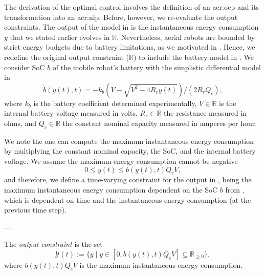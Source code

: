 The derivation of the optimal control involves the definition of an \Gls{acr:ocp} and its transformation into an \Gls{acr:nlp}. Before, however, we re-evaluate the output constraints. The output of the model in  is the instantaneous energy consumption $y$ that we stated earlier evolves in $\mathbb{R}$. Nevertheless, aerial robots are bounded by strict energy budgets due to battery limitations, as we motivated in . Hence, we redefine the original output constraint ($\mathbb{R}$) to include the battery model in . We consider SoC $b$ of the mobile robot's battery with the simplistic differential model in 
\begin{equation}\label{eq:bat}
  \dot{b}(y(t),t)=-k_b\left(V-
  \sqrt{
    V^2-
    4R_ry(t)}
  \right)/(2R_rQ_c),
\end{equation}
where $k_b$ is the battery coefficient determined experimentally,  $V\in\mathbb{R}$ is the internal battery voltage measured in volts, $R_r\in\mathbb{R}$ the resistance measured in ohms, and $Q_c\in\mathbb{R}$ the constant nominal capacity measured in amperes per hour. 

We note the one can compute the maximum instantaneous energy consumption by multiplying the constant nominal capacity, the SoC, and the internal battery voltage. We assume the maximum energy consumption cannot be negative
\begin{equation}
  0\leq y(t)\leq b(y(t),t)Q_cV,
\end{equation}
and therefore, we define a time-varying constraint for the output in , being the maximum instantaneous energy consumption dependent on the SoC $b$ from , which is dependent on time and the instantaneous energy consumption (at the previous time step).

---

\begin{highlight}
\begin{defn}\label{def:const}
The \emph{output constraint} is the set
\begin{equation*}
  \mathcal{Y}(t):=\{y\mid y\in[0,b(y(t),t)Q_cV]\subseteq{\mathbb{R}_{\geq 0}}\},
\end{equation*}
where $b(y(t),t)Q_cV$ is the maximum instantaneous energy consumption.
\end{defn}
\end{highlight}

